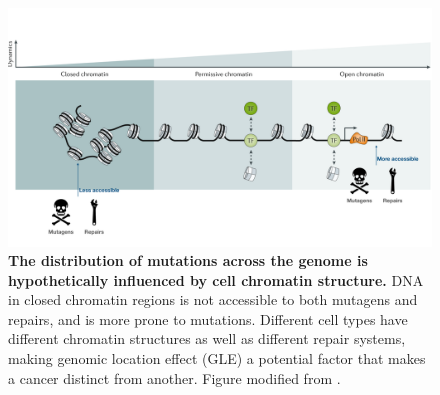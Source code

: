 \begin{figure}[h!]
    \centering
    \includegraphics[scale=0.24]{graphics/chromatin_demo.pdf}
    \caption{\textbf{The distribution of mutations across the genome is hypothetically influenced by cell chromatin structure.} DNA in closed chromatin regions is not accessible to both mutagens and repairs, and is more prone to mutations. Different cell types have different chromatin structures as well as different repair systems, making genomic location effect (GLE) a potential factor that makes a cancer distinct from another. Figure modified from \citet{Klemm2019ChromatinEpigenome}.}
    \label{fig:chromatin_demo}
\end{figure}
